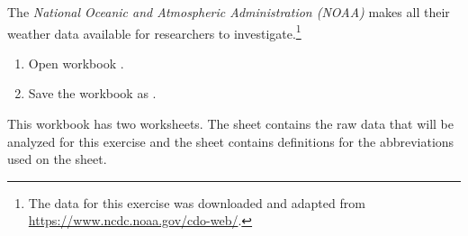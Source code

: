 The \textit{National Oceanic and Atmospheric Administration (NOAA)} makes all their weather data available for researchers to investigate.\footnote{The data for this exercise was downloaded and adapted from \url{https://www.ncdc.noaa.gov/cdo-web/}.}

\begin{enumbox}
	\begin{enumerate}
		\item Open workbook .
		\item Save the workbook as .
	\end{enumerate}
\end{enumbox}

This workbook has two worksheets. The  sheet contains the raw data that will be analyzed for this exercise and the  sheet contains definitions for the abbreviations used on the  sheet.

